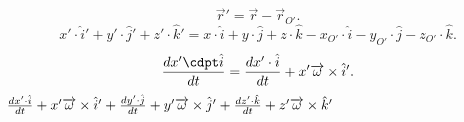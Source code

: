 \documentclass[12px]{article}
\begin{document}
\[
	\overrightarrow{r}' = \overrightarrow{r}- \overrightarrow{r}_{O'}
.\] 
\[
	x'\cdot \hat i' + y'\cdot \hat j' + z'\cdot \hat k' = x\cdot\hat i + y\cdot\hat j + z\cdot\hat k - x_{O'}\cdot \hat i - y_{O'}\cdot \hat j - z_{O'}\cdot \hat k
.\] 
\[
	\diff{x'\cdpt\hat i }{t} = \diff {x'\cdot \hat i} t + x' \overrightarrow{\omega}\times \hat i'
.\] 
$

\diff{x'\cdot \hat {i}}{t} + x' \overrightarrow{\omega}\times \hat i' + 
	\diff {y'\cdot \hat j} {t} + y' \overrightarrow{\omega}\times \hat j' + 
	\diff {z'\cdot \hat k} t + z' \overrightarrow{\omega}\times \hat k'
$
\end{document}
